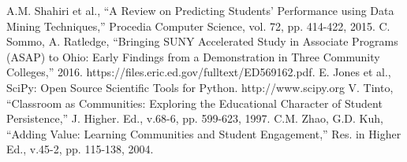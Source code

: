 \documentclass[conference]{IEEEtran}
\begin{document}
\begin{thebibliography}{00}
 A.M. Shahiri et al., ``A Review on Predicting Students' Performance using Data Mining Techniques,'' Procedia Computer Science, vol. 72, pp. 414-422, 2015.
 C. Sommo, A. Ratledge, ``Bringing SUNY Accelerated Study in Associate Programs (ASAP) to Ohio: Early Findings from a Demonstration in Three Community Colleges,'' 2016. https://files.eric.ed.gov/fulltext/ED569162.pdf.  
 E. Jones et al., SciPy: Open Source Scientific Tools for Python. http://www.scipy.org
 V. Tinto, ``Classroom as Communities: Exploring the Educational Character of Student Persistence,'' J. Higher. Ed., v.68-6, pp. 599-623, 1997.
 C.M. Zhao, G.D. Kuh, ``Adding Value: Learning Communities and Student Engagement,'' Res. in Higher Ed., v.45-2, pp. 115-138, 2004.

\end{thebibliography}
\end{document}
